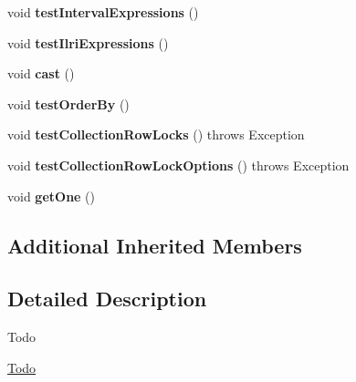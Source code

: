 \begin{DoxyCompactItemize}
void {\bfseries test\+Interval\+Expressions} ()
\item 
\mbox{\label{classtestsuite_1_1x_1_1devapi_1_1_collection_find_test_a628ce570b8d9e39fedef3676c395e7da}} 
void {\bfseries test\+Ilri\+Expressions} ()
\item 
\mbox{\label{classtestsuite_1_1x_1_1devapi_1_1_collection_find_test_a522e87fd01482936a3f2fbf78a6c27e7}} 
void {\bfseries cast} ()
\item 
\mbox{\label{classtestsuite_1_1x_1_1devapi_1_1_collection_find_test_ad6122cdd8010174aad944f962ccb2c8a}} 
void {\bfseries test\+Order\+By} ()
\item 
\mbox{\label{classtestsuite_1_1x_1_1devapi_1_1_collection_find_test_aaff8756087bb2da824fde7cfbe7c1b6f}} 
void {\bfseries test\+Collection\+Row\+Locks} ()  throws Exception 
\item 
\mbox{\label{classtestsuite_1_1x_1_1devapi_1_1_collection_find_test_a4095f02c90282daf5642db4e4cdf6955}} 
void {\bfseries test\+Collection\+Row\+Lock\+Options} ()  throws Exception 
\item 
\mbox{\label{classtestsuite_1_1x_1_1devapi_1_1_collection_find_test_a09f863b160cf7b51e2fb76b712090cdc}} 
void {\bfseries get\+One} ()
\end{DoxyCompactItemize}
\subsection*{Additional Inherited Members}


\subsection{Detailed Description}
\begin{DoxyRefDesc}{Todo}
\item[\mbox{\hyperlink{todo__todo000005}{Todo}}]\end{DoxyRefDesc}



